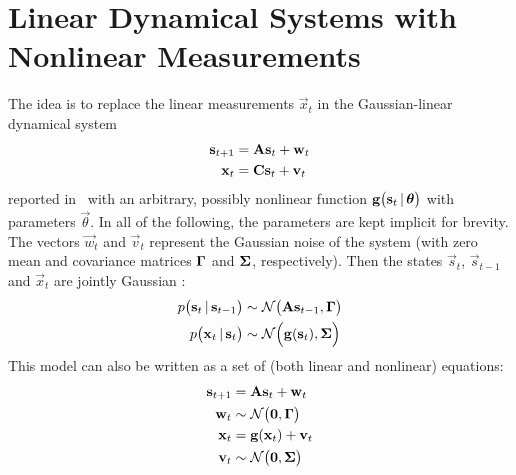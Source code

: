 \section{Linear Dynamical Systems with Nonlinear Measurements}
	The idea is to replace the linear measurements \( \vec{x}_t \) in the Gaussian-linear dynamical system
	\begin{align*}
		\vec{s}_{t + 1} & = \mat{A} \vec{s}_t + \vec{w}_t \\
		\vec{x}_t       & = \mat{C} \vec{s}_t + \vec{v}_t
	\end{align*}
	reported in~\cite{ghahramaniParameterEstimationLinear1996} with an arbitrary, possibly nonlinear function \( \vec{g}\paren{\vec{s}_t \given \vec{\theta}} \) with parameters \( \vec{\theta} \). In all of the following, the parameters are kept implicit for brevity. The vectors \( \vec{w}_t \) and \( \vec{v}_t \)	represent the Gaussian noise of the system (with zero mean and covariance matrices \( \mat{\Gamma} \) and \( \mat{\Sigma} \), respectively). Then the states \( \vec{s}_t \), \( \vec{s}_{t - 1} \) and \( \vec{x}_t \) are jointly Gaussian \cite{minkaHiddenMarkovModels1999}:
	\begin{align*}
		p\paren{\vec{s}_t \given \vec{s}_{t - 1}} &\sim \normal\paren{\mat{A} \vec{s}_{t - 1}, \mat{\Gamma}} \\
		p\paren{\vec{x}_t \given \vec{s}_t}       &\sim \normal\paren{\vec{g}\paren{\vec{s}_t}, \mat{\Sigma}}
	\end{align*}
	This model can also be written as a set of (both linear and nonlinear) equations:
	\begin{align*}
		\vec{s}_{t + 1} & =    \mat{A} \vec{s}_t + \vec{w}_t          \\
		\vec{w}_t       & \sim \normal\paren{\vec{0}, \mat{\Gamma}}   \\
		\vec{x}_t       & =    \vec{g}\paren{\vec{x}_t} + \vec{v}_t \\
		\vec{v}_t       & \sim \normal\paren{\vec{0}, \mat{\Sigma}}
	\end{align*}
	
